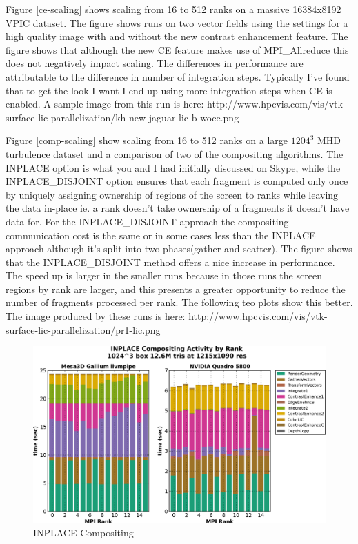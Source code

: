 \documentclass[a4paper,10pt]{article}
\begin{document}
Figure \ref{ce-scaling} shows scaling from 16 to 512 ranks on a massive 16384x8192 VPIC dataset.  The figure shows runs on two vector fields using the settings for a high quality image with and without the new contrast enhancement feature. The figure shows that although the new CE feature makes use of MPI\_Allreduce this does not negatively impact scaling. The differences in performance are attributable to the difference in number of integration steps. Typically I've found that to get the look I want I end up using more integration steps when CE is enabled. A sample image from this run is here: http://www.hpcvis.com/vis/vtk-surface-lic-parallelization/kh-new-jaguar-lic-b-woce.png

Figure \ref{comp-scaling} show scaling from 16 to 512 ranks on a large $1204^3$ MHD turbulence dataset and a comparison of two of the compositing algorithms. The INPLACE option is what you and I had initially discussed on Skype, while the INPLACE\_DISJOINT option ensures that each fragment is computed only once by uniquely assigning ownership of regions of the screen to ranks while leaving the data in-place ie. a rank doesn't take ownership of a fragments it doesn't have data for. For the INPLACE\_DISJOINT approach the compositing communication cost is the same or in some cases less than the INPLACE approach although it's split into two phases(gather and scatter). The figure shows that the INPLACE\_DISJOINT method offers a nice increase in performance. The speed up is larger in the smaller runs because in those runs the screen regions by rank are larger, and this presents a greater opportunity to reduce the number of fragments processed per rank. The following teo plots show this better. The image produced by these runs is here: http://www.hpcvis.com/vis/vtk-surface-lic-parallelization/pr1-lic.png

\begin{figure}[h]
 \centering
 \includegraphics[width=1.0\textwidth]{./scaling-gant-inplace-composite-gpu-mesa.png}
 \caption{INPLACE Compositing}
 \label{fig:inplace-comp}
\end{figure}
\end{document}
